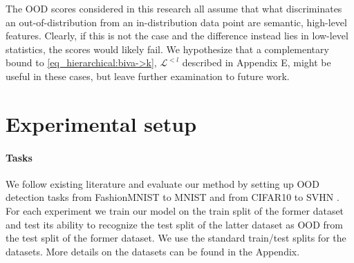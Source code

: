 {The OOD scores considered in this research all assume that what discriminates an out-of-distribution from an in-distribution data point are semantic, high-level features. Clearly, if this is not the case and the difference instead lies in low-level statistics, the scores would likely fail. We hypothesize that a complementary bound to \cref{eq_hierarchical:biva->k}, $\mathcal{L}^{<l}$ described in Appendix E, might be useful in these cases, but leave further examination to future work.


\section{Experimental setup}

\paragraph{Tasks} We follow existing literature \cite{nalisnick_deep_2019, hendrycks_deep_2019} and evaluate our method by setting up OOD detection tasks from FashionMNIST \cite{xiao_fashionmnist_2017} to MNIST \cite{lecun_gradientbased_1998} and from CIFAR10 \cite{krizhevsky_learning_2009} to SVHN \cite{netzer_reading_2011}.
For each experiment we train our model on the train split of the former dataset and test its ability to recognize the test split of the latter dataset as OOD from the test split of the former dataset.
We use the standard train/test splits for the datasets.
More details on the datasets can be found in the Appendix.


\begin{figure}[t]
    \centering
\end{figure}}
